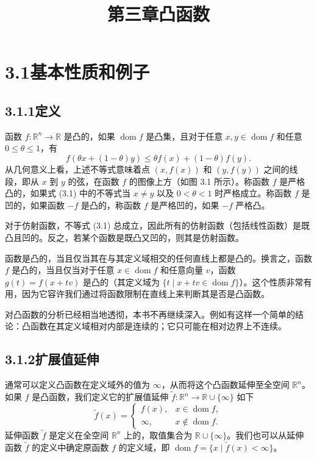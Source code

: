 \documentclass[UTF8, 12pt, fontset=fandol, oneside]{ctexart}
\title{第三章\quad 凸函数}
\author{}
\date{}
\DeclareMathOperator{\dom}{dom}
\begin{document}
\maketitle

\section*{3.1\quad 基本性质和例子}

\subsection*{3.1.1\quad 定义}

函数 $f:\mathbb{R}^n\to\mathbb{R}$ 是凸的，如果 $\dom f$ 是凸集，且对于任意 $x,y\in\dom f$ 和任意 $0\leq\theta\leq 1$，有
\begin{equation}
f(\theta x+(1-\theta)y)\leq \theta f(x)+(1-\theta)f(y).
\tag{3.1}
\end{equation}
从几何意义上看，上述不等式意味着点 $(x,f(x))$ 和 $(y,f(y))$ 之间的线段，即从 $x$ 到 $y$ 的弦，在函数 $f$ 的图像上方（如图 3.1 所示）。称函数 $f$ 是严格凸的，如果式 (3.1) 中的不等式当 $x\neq y$ 以及 $0<\theta<1$ 时严格成立。称函数 $f$ 是凹的，如果函数 $-f$ 是凸的，称函数 $f$ 是严格凹的，如果 $-f$ 严格凸。

对于仿射函数，不等式 (3.1) 总成立，因此所有的仿射函数（包括线性函数）是既凸且凹的。反之，若某个函数是既凸又凹的，则其是仿射函数。

函数是凸的，当且仅当其在与其定义域相交的任何直线上都是凸的。换言之，函数 $f$ 是凸的，当且仅当对于任意 $x\in\dom f$ 和任意向量 $v$，函数 $g(t)=f(x+tv)$ 是凸的（其定义域为 $\{t\mid x+tv\in\dom f\}$）。这个性质非常有用，因为它容许我们通过将函数限制在直线上来判断其是否是凸函数。

对凸函数的分析已经相当地透彻，本书不再继续深入。例如有这样一个简单的结论：凸函数在其定义域相对内部是连续的；它只可能在相对边界上不连续。

\subsection*{3.1.2\quad 扩展值延伸}

通常可以定义凸函数在定义域外的值为 $\infty$，从而将这个凸函数延伸至全空间 $\mathbb{R}^n$。如果 $f$ 是凸函数，我们定义它的扩展值延伸 $\tilde f:\mathbb{R}^n\to\mathbb{R}\cup\{\infty\}$ 如下
\[
\tilde f(x)=
\begin{cases}
f(x), & x\in\dom f,\\
\infty, & x\notin\dom f.
\end{cases}
\]
延伸函数 $\tilde f$ 是定义在全空间 $\mathbb{R}^n$ 上的，取值集合为 $\mathbb{R}\cup\{\infty\}$。我们也可以从延伸函数 $\tilde f$ 的定义中确定原函数 $f$ 的定义域，即 $\dom f=\{x\mid \tilde f(x)<\infty\}$。
\end{document}
